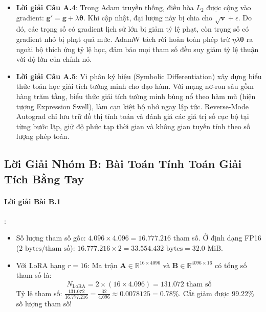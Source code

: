 \begin{itemize}
  \item \textbf{Lời giải Câu A.4}:
  Trong Adam truyền thống, điều hòa $L_2$ được cộng vào gradient: $\mathbf{g}' = \mathbf{g} + \lambda \boldsymbol{\theta}$. Khi cập nhật, đại lượng này bị chia cho $\sqrt{\mathbf{v}} + \epsilon$. Do đó, các trọng số có gradient lịch sử lớn bị giảm tỷ lệ phạt, còn trọng số có gradient nhỏ bị phạt quá mức. AdamW tách rời hoàn toàn phép trừ $\eta \lambda \boldsymbol{\theta}$ ra ngoài bộ thích ứng tỷ lệ học, đảm bảo mọi tham số đều suy giảm tỷ lệ thuận với độ lớn của chính nó.

  \item \textbf{Lời giải Câu A.5}:
  Vi phân ký hiệu (Symbolic Differentiation) xây dựng biểu thức toán học giải tích tường minh cho đạo hàm. Với mạng nơ-ron sâu gồm hàng trăm tầng, biểu thức giải tích tường minh bùng nổ theo hàm mũ (hiện tượng Expression Swell), làm cạn kiệt bộ nhớ ngay lập tức. Reverse-Mode Autograd chỉ lưu trữ đồ thị tính toán và đánh giá các giá trị số cục bộ tại từng bước lặp, giữ độ phức tạp thời gian và không gian tuyến tính theo số lượng phép toán.
\end{itemize}

\subsection{Lời Giải Nhóm B: Bài Toán Tính Toán Giải Tích Bằng Tay}

\paragraph{Lời giải Bài B.1}:
\begin{itemize}
  \item[a)] Số lượng tham số gốc: $4.096 \times 4.096 = 16.777.216$ tham số.
  Ở định dạng FP16 ($2\text{ bytes/tham số}$): $16.777.216 \times 2 = 33.554.432\text{ bytes} = 32.0\text{ MiB}$.
  \item[b)] Với LoRA hạng $r = 16$: Ma trận $\mathbf{A} \in \mathbb{R}^{16 \times 4096}$ và $\mathbf{B} \in \mathbb{R}^{4096 \times 16}$ có tổng số tham số là:
  \begin{equation*}
  N_{\text{LoRA}} = 2 \times (16 \times 4.096) = 131.072\text{ tham số}
  \end{equation*}
  Tỷ lệ tham số: $\frac{131.072}{16.777.216} = \frac{32}{4.096} \approx 0.0078125 = 0.78\%$.
  Cắt giảm được \textbf{$99.22\%$} số lượng tham số!
\end{itemize}

